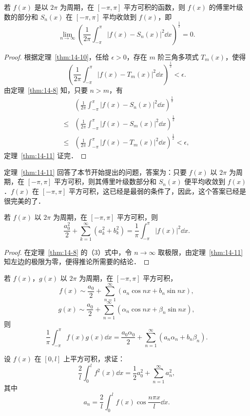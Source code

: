 \begin{theorem}\label{thm:14-11}
若 $f(x)$ 是以 $2\pi$ 为周期，在 $[-\pi,\pi]$ 平方可积的函数，则 $f(x)$ 的傅里叶级数的部分和 $S_{n}(x)$ 在 $[-\pi,\pi]$ 平均收敛到 $f(x)$，即
\[
\lim_{n\to\infty}\left(\frac{1}{2\pi}\int_{-\pi}^{\pi}\left|f(x)-S_{n}(x)\right|^{2}\dd x\right)^{\frac{1}{2}}=0.
\]
\end{theorem}

\begin{proof}
根据定理~\ref{thm:14-10}，任给 $\epsilon>0$，存在 $m$ 阶三角多项式 $T_{m}(x)$，使得
\[
\left(\frac{1}{2\pi}\int_{-\pi}^{\pi}\left|f(x)-T_{m}(x)\right|^{2}\dd x\right)^{\frac{1}{2}}<\epsilon.
\]
由定理~\ref{thm:14-8} 知，只要 $n>m$，有
\[
\begin{aligned}
&\left(\frac{1}{2\pi}\int_{-\pi}^{\pi}\left|f(x)-S_{n}(x)\right|^{2}\dd x\right)^{\frac{1}{2}}\\
\leqslant{}&\left(\frac{1}{2\pi}\int_{-\pi}^{\pi}\left|f(x)-S_{m}(x)\right|^{2}\dd x\right)^{\frac{1}{2}}\\
\leqslant{}&\left(\frac{1}{2\pi}\int_{-\pi}^{\pi}\left|f(x)-T_{m}(x)\right|^{2}\dd x\right)^{\frac{1}{2}}<\epsilon,
\end{aligned}
\]
定理~\ref{thm:14-11} 证完．
\end{proof}

定理~\ref{thm:14-11} 回答了本节开始提出的问题，答案为：只要 $f(x)$ 以 $2\pi$ 为周期，在 $[-\pi,\pi]$ 平方可积，则其傅里叶级数部分和 $S_{n}(x)$ 便平均收敛到 $f(x)$．$f(x)$ 在 $[-\pi,\pi]$ 平方可积，这已经是最弱的条件了，因此，这个答案已经是很完美的了．

\begin{corollary}\label{cor:14-4-1}
若 $f(x)$ 以 $2\pi$ 为周期，在 $[-\pi,\pi]$ 平方可积，则
\[
\frac{a_{0}^{2}}{2}+\sum_{k=1}^{\infty}\left(a_{k}^{2}+b_{k}^{2}\right)=\frac{1}{\pi}\int_{-\pi}^{\pi}\left|f(x)\right|^{2}\dd x.
\]
\end{corollary}

\begin{proof}
在定理~\ref{thm:14-8} 的（3）式中，令 $n\to\infty$ 取极限，由定理~\ref{thm:14-11} 知左边的极限为零，便得推论所需要的结论．
\end{proof}

\begin{xiti}
\item 若 $f(x)$，$g(x)$ 以 $2\pi$ 为周期，在 $[-\pi,\pi]$ 平方可积，
\[
f(x)\sim\frac{a_{0}}{2}+\sum_{n=1}^{\infty}\left(a_{n}\cos nx+b_{n}\sin nx\right),
\]
\[
g(x)\sim\frac{a_{0}}{2}+\sum_{n=1}^{\infty}\left(\alpha_{n}\cos nx+\beta_{n}\sin nx\right),
\]
则
\[
\frac{1}{\pi}\int_{-\pi}^{\pi}f(x)g(x)\dd x=\frac{a_{0}\alpha_{0}}{2}+\sum_{n=1}^{\infty}\left(a_{n}\alpha_{n}+b_{n}\beta_{n}\right).
\]
\item 设 $f(x)$ 在 $[0,l]$ 上平方可积，求证：
\[
\frac{2}{l}\int_{0}^{l}f^{2}(x)\dd x=\frac{1}{2}a_{0}^{2}+\sum_{n=1}^{\infty}a_{n}^{2},
\]
其中
\[
a_{n}=\frac{2}{l}\int_{0}^{l}f(x)\cos\frac{n\pi x}{l}\dd x.
\]
\end{xiti}
